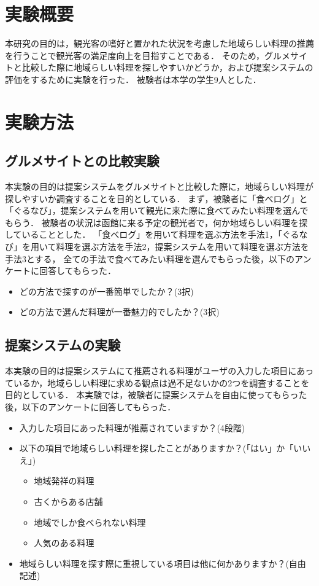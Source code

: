 \documentclass{funthesis}
\begin{document}
\section{実験概要}
本研究の目的は，観光客の嗜好と置かれた状況を考慮した地域らしい料理の推薦を行うことで観光客の満足度向上を目指すことである．
そのため，グルメサイトと比較した際に地域らしい料理を探しやすいかどうか，および提案システムの評価をするために実験を行った．
被験者は本学の学生9人とした．

\section{実験方法}
\subsection{グルメサイトとの比較実験}
本実験の目的は提案システムをグルメサイトと比較した際に，地域らしい料理が探しやすいか調査することを目的としている．
まず，被験者に「食べログ」と「ぐるなび」，提案システムを用いて観光に来た際に食べてみたい料理を選んでもらう．
被験者の状況は函館に来る予定の観光者で，何か地域らしい料理を探していることとした．
「食べログ」を用いて料理を選ぶ方法を手法1，「ぐるなび」を用いて料理を選ぶ方法を手法2，提案システムを用いて料理を選ぶ方法を手法3とする，
全ての手法で食べてみたい料理を選んでもらった後，以下のアンケートに回答してもらった．

\begin{itemize}
 \item どの方法で探すのが一番簡単でしたか？(3択)
 \item どの方法で選んだ料理が一番魅力的でしたか？(3択)
\end{itemize}

\subsection{提案システムの実験}
本実験の目的は提案システムにて推薦される料理がユーザの入力した項目にあっているか，地域らしい料理に求める観点は過不足ないかの2つを調査することを目的としている．
本実験では，被験者に提案システムを自由に使ってもらった後，以下のアンケートに回答してもらった．

\begin{itemize}
 \item 入力した項目にあった料理が推薦されていますか？(4段階)
 \item 以下の項目で地域らしい料理を探したことがありますか？(「はい」か「いいえ」)
 \begin{itemize}
 \item 地域発祥の料理
  \item 古くからある店舗
   \item 地域でしか食べられない料理
    \item 人気のある料理
  \end{itemize}
 \item 地域らしい料理を探す際に重視している項目は他に何かありますか？(自由記述)
 \end{itemize}
\end{document}
